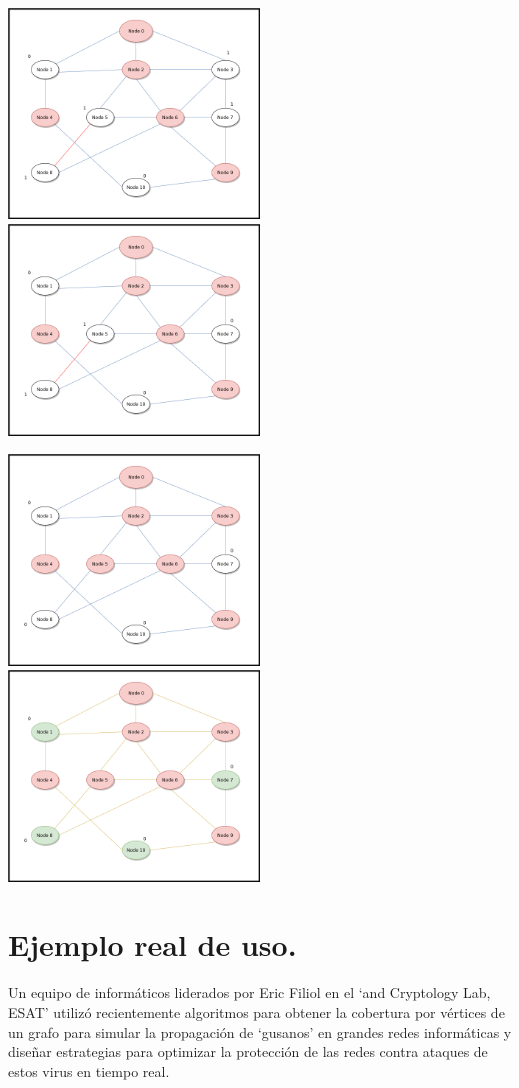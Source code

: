 \documentclass[a4paper, 11pt]{article}
\begin{document}
\includegraphics[width=0.5\textwidth]{gif-6.png}
\includegraphics[width=0.5\textwidth]{gif-7.png}

\includegraphics[width=0.5\textwidth]{gif-8.png}
\includegraphics[width=0.5\textwidth]{gif-9.png}

\pagebreak

\section{Ejemplo real de uso.}
Un equipo de informáticos liderados por Eric Filiol en el `and Cryptology Lab, ESAT' utilizó recientemente algoritmos para obtener la cobertura por vértices de un grafo para simular la propagación de `gusanos' en grandes redes informáticas y diseñar estrategias para optimizar la protección de las redes contra ataques de estos virus en tiempo real.
\end{document}
